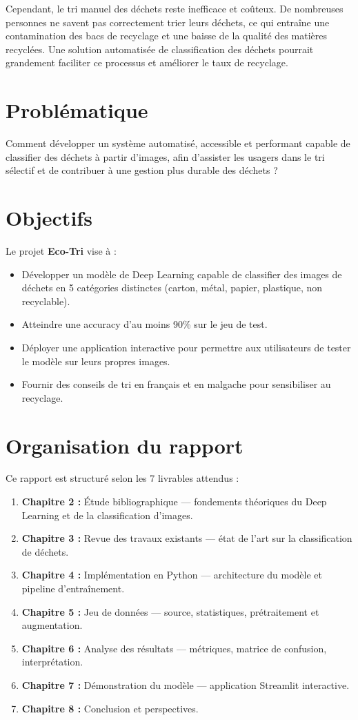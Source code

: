 \documentclass[12pt,a4paper]{report}
\begin{document}
Cependant, le tri manuel des déchets reste inefficace et coûteux. De nombreuses personnes ne savent pas correctement trier leurs déchets, ce qui entraîne une contamination des bacs de recyclage et une baisse de la qualité des matières recyclées. Une solution automatisée de classification des déchets pourrait grandement faciliter ce processus et améliorer le taux de recyclage.

\section{Problématique}
Comment développer un système automatisé, accessible et performant capable de classifier des déchets à partir d'images, afin d'assister les usagers dans le tri sélectif et de contribuer à une gestion plus durable des déchets ?

\section{Objectifs}
Le projet \textbf{Eco-Tri} vise à :
\begin{itemize}
    \item Développer un modèle de Deep Learning capable de classifier des images de déchets en 5 catégories distinctes (carton, métal, papier, plastique, non recyclable).
    \item Atteindre une accuracy d'au moins 90\% sur le jeu de test.
    \item Déployer une application interactive pour permettre aux utilisateurs de tester le modèle sur leurs propres images.
    \item Fournir des conseils de tri en français et en malgache pour sensibiliser au recyclage.
\end{itemize}

\section{Organisation du rapport}
Ce rapport est structuré selon les 7 livrables attendus :
\begin{enumerate}
    \item \textbf{Chapitre 2 :} Étude bibliographique --- fondements théoriques du Deep Learning et de la classification d'images.
    \item \textbf{Chapitre 3 :} Revue des travaux existants --- état de l'art sur la classification de déchets.
    \item \textbf{Chapitre 4 :} Implémentation en Python --- architecture du modèle et pipeline d'entraînement.
    \item \textbf{Chapitre 5 :} Jeu de données --- source, statistiques, prétraitement et augmentation.
    \item \textbf{Chapitre 6 :} Analyse des résultats --- métriques, matrice de confusion, interprétation.
    \item \textbf{Chapitre 7 :} Démonstration du modèle --- application Streamlit interactive.
    \item \textbf{Chapitre 8 :} Conclusion et perspectives.
\end{enumerate}
\end{document}
